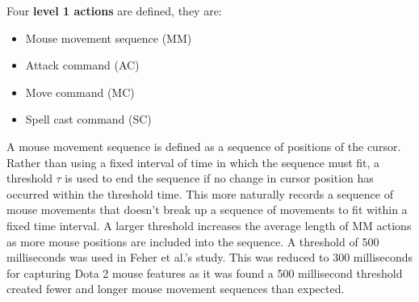 \documentclass[Report.tex]{subfiles}
\begin{document}
Four \textbf{level 1 actions} are defined, they are:
\begin{itemize}
\item Mouse movement sequence (MM)
\item Attack command (AC)
\item Move command (MC)
\item Spell cast command (SC)
\end{itemize}
A mouse movement sequence is defined as a sequence of positions of the cursor. Rather than using a fixed interval of time in which the sequence must fit, a threshold $\tau$ is used to end the sequence if no change in cursor position has occurred within the threshold time. This more naturally records a sequence of mouse movements that doesn't break up a sequence of movements to fit within a fixed time interval. A larger threshold increases the average length of MM actions as more mouse positions are included into the sequence. A threshold of 500 milliseconds was used in Feher et al.'s \cite{mouse-dynamics} study. This was reduced to 300 milliseconds for capturing Dota 2 mouse features as it was found a 500 millisecond threshold created fewer and longer mouse movement sequences than expected. 
\end{document}
